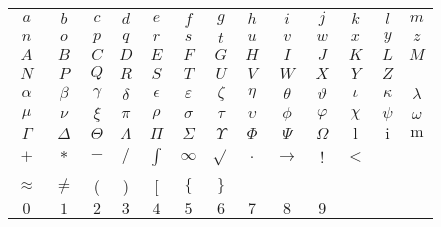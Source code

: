 \documentclass[20pt]{extreport}
\begin{document}
\begin{center}
	\begin{tabular}{ c c c c c c c c c c c c c }
		\( a \) & \( b \) & \( c \) & \( d \) & \( e \) & \( f \) & \( g \) & \( h \) & \( i \) & \( j \) & \( k \) & \( l \) & \( m \) \\ 
		\( n \) & \( o \) & \( p \) & \( q \) & \( r \) & \( s \) & \( t \) & \( u \) & \( v \) & \( w \) & \( x \) & \( y \) & \( z \)\\  

		\( A \) & \( B \) & \( C \) & \( D \) & \( E \) & \( F \) & \( G \) & \( H \) & \( I \) & \( J \) & \( K \) & \( L \) & \( M \)\\ 

		\( N \) & \( P \) & \( Q \) & \( R \) & \( S \) & \( T \) & \( U \) & \( V \) & \( W \) & \( X \) & \( Y \) & \( Z \)\\ 

		\(\alpha\) & \( \beta \) & \( \gamma \) & \( \delta \) & \( \epsilon \) & \(\varepsilon \) & \( \zeta \) & \( \eta \) & \( \theta \) & \(\vartheta\) & \( \iota \) & \( \kappa \) & \( \lambda \)\\
		
		\( \mu\) & \(\nu \) & \(\xi\) & \(\pi\) & \(\rho\) & \(\sigma \) & \(\tau \) & \(\upsilon \) & \(\phi \) & \(\varphi\)& \(\chi \) & \(\psi \) & \(\omega \) \\
		
		\(\Gamma \) & \(\Delta \) & \(\Theta\) & \(\Lambda\) & \(\Pi\) & \(\Sigma\) & \(\Upsilon\) & \(\Phi\) & \(\Psi\) & \(\Omega\) & \(\mathrm{l}\) & \(\mathrm{i}\) & \(\mathrm{m}\) \\
		
		\(+\) & \(*\) & \(-\) & \( / \) & \(\int \) & \(\infty \) & \(\sqrt{} \) & \(.\) & \(\rightarrow \) & ! & \(<\)  \\
		
		\(\approx \) & \(\neq \) & ( & ) & [ & \(\{ \) & \( \} \)\\
		
		\( 0 \) & \( 1 \) & \( 2 \) & \( 3 \) & \( 4 \) & \( 5 \) & \( 6 \) & \( 7 \) & \( 8 \) & \( 9 \)\\
	\end{tabular}
\end{center}
\end{document}
